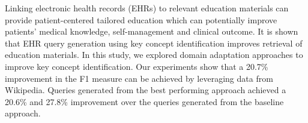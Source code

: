 Linking electronic health records (EHRs) to relevant education materials can provide patient-centered tailored education which can potentially improve patients' medical knowledge, self-management and clinical outcome. It is shown that EHR query generation using key concept identification improves retrieval of education materials. In this study, we explored domain adaptation approaches to improve key concept identification. Our experiments show that a 20.7\% improvement in the F1 measure can be achieved by leveraging data from Wikipedia. Queries generated from the best performing approach achieved a 20.6\% and 27.8\% improvement over the queries generated from the baseline approach.
